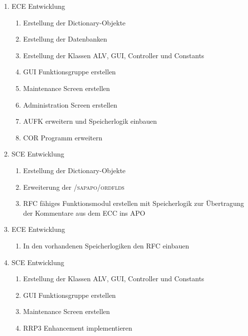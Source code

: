 \begin{enumerate}[itemsep=0em,partopsep=0em,parsep=0em,topsep=0em]
	\item ECE Entwicklung
	\begin{enumerate}
		\item Erstellung der Dictionary-Objekte
		\item Erstellung der Datenbanken
		\item Erstellung der Klassen ALV, GUI, Controller und Constants
		\item GUI Funktionsgruppe erstellen
		\item Maintenance Screen erstellen
		\item Administration Screen erstellen
		\item AUFK erweitern und Speicherlogik einbauen
		\item COR Programm erweitern
	\end{enumerate}
	\item SCE Entwicklung
	\begin{enumerate}
		\item Erstellung der Dictionary-Objekte
		\item Erweiterung der \textsc{/sapapo/ordflds}
		\item RFC fähiges Funktionsmodul erstellen mit Speicherlogik zur Übertragung der Kommentare aus dem ECC ins APO
	\end{enumerate}
	\item ECE Entwicklung
	\begin{enumerate}
		\item In den vorhandenen Speicherlogiken den RFC einbauen
	\end{enumerate}
	\item SCE Entwicklung
	\begin{enumerate}
		\item Erstellung der Klassen ALV, GUI, Controller und Constants
		\item GUI Funktionsgruppe erstellen
		\item Maintenance Screen erstellen
		\item RRP3 Enhancement implementieren
	\end{enumerate}
\end{enumerate}